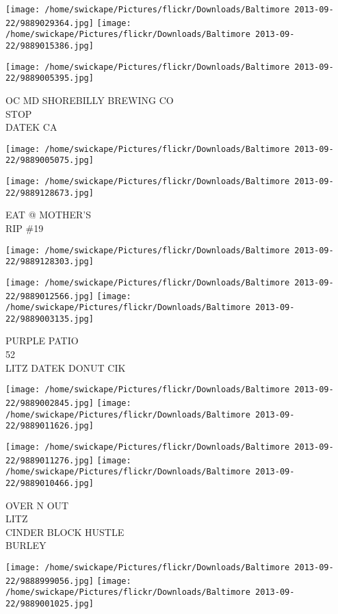\documentclass[10pt,letterpaper]{article}
\begin{document}
\texttt{[image: /home/swickape/Pictures/flickr/Downloads/Baltimore 2013-09-22/9889029364.jpg]}
\texttt{[image: /home/swickape/Pictures/flickr/Downloads/Baltimore 2013-09-22/9889015386.jpg]}

\vspace{0.25in}
\texttt{[image: /home/swickape/Pictures/flickr/Downloads/Baltimore 2013-09-22/9889005395.jpg]}

OC MD SHOREBILLY BREWING CO\\
STOP\\
DATEK CA
\pagebreak

\texttt{[image: /home/swickape/Pictures/flickr/Downloads/Baltimore 2013-09-22/9889005075.jpg]}

\vspace{0.25in}
\texttt{[image: /home/swickape/Pictures/flickr/Downloads/Baltimore 2013-09-22/9889128673.jpg]}

EAT @ MOTHER'S\\
RIP \#19
\pagebreak

\texttt{[image: /home/swickape/Pictures/flickr/Downloads/Baltimore 2013-09-22/9889128303.jpg]}

\vspace{0.25in}
\texttt{[image: /home/swickape/Pictures/flickr/Downloads/Baltimore 2013-09-22/9889012566.jpg]}
\texttt{[image: /home/swickape/Pictures/flickr/Downloads/Baltimore 2013-09-22/9889003135.jpg]}

PURPLE PATIO\\
52\\
LITZ DATEK DONUT CIK
\pagebreak

\texttt{[image: /home/swickape/Pictures/flickr/Downloads/Baltimore 2013-09-22/9889002845.jpg]}
\texttt{[image: /home/swickape/Pictures/flickr/Downloads/Baltimore 2013-09-22/9889011626.jpg]}

\texttt{[image: /home/swickape/Pictures/flickr/Downloads/Baltimore 2013-09-22/9889011276.jpg]}
\texttt{[image: /home/swickape/Pictures/flickr/Downloads/Baltimore 2013-09-22/9889010466.jpg]}

OVER N OUT\\
LITZ\\
CINDER BLOCK HUSTLE\\
BURLEY
\pagebreak

\texttt{[image: /home/swickape/Pictures/flickr/Downloads/Baltimore 2013-09-22/9888999056.jpg]}
\texttt{[image: /home/swickape/Pictures/flickr/Downloads/Baltimore 2013-09-22/9889001025.jpg]}
\end{document}
